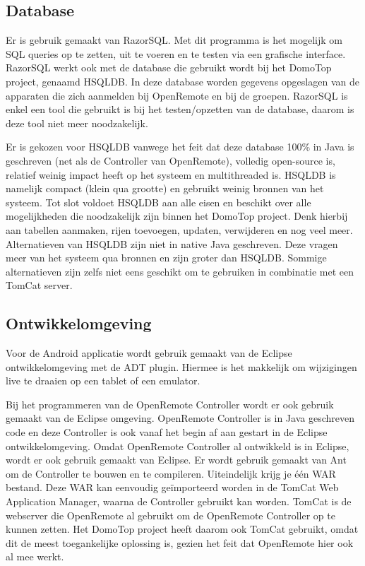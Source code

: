 \documentclass[]{article}
\begin{document}
\subsection{Database}
Er is gebruik gemaakt van RazorSQL. Met dit programma is het mogelijk om
SQL queries op te zetten, uit te voeren en te testen via een grafische
interface. RazorSQL werkt ook met de database die gebruikt wordt bij het DomoTop project,
genaamd HSQLDB. In deze database worden gegevens opgeslagen van de
apparaten die zich aanmelden bij OpenRemote en bij de groepen.
RazorSQL is enkel een tool die gebruikt is bij het
testen/opzetten van de database, daarom is deze tool niet meer
noodzakelijk.

Er is gekozen voor HSQLDB vanwege het feit dat deze database 100\% in Java
is geschreven (net als de Controller van OpenRemote), volledig open-source is,
relatief weinig impact heeft op het systeem en multithreaded is.
HSQLDB is namelijk compact (klein qua grootte) en gebruikt weinig bronnen van het systeem. 
Tot slot voldoet HSQLDB aan alle eisen en beschikt over alle mogelijkheden die noodzakelijk
zijn binnen het DomoTop project. Denk hierbij aan tabellen aanmaken, rijen
toevoegen, updaten, verwijderen en nog veel meer. Alternatieven van HSQLDB zijn
niet in native Java geschreven. Deze vragen meer van het systeem qua
bronnen en zijn groter dan HSQLDB. Sommige alternatieven zijn zelfs niet
eens geschikt om te gebruiken in combinatie met een TomCat server.

\subsection{Ontwikkelomgeving}
Voor de Android applicatie wordt gebruik gemaakt van de Eclipse
ontwikkelomgeving met de ADT plugin. Hiermee is het makkelijk om wijzigingen
live te draaien op een tablet of een emulator.

Bij het programmeren van de OpenRemote Controller wordt er ook gebruik gemaakt
van de Eclipse omgeving. OpenRemote Controller is in Java geschreven code
en deze Controller is ook vanaf het begin af aan gestart in de Eclipse
ontwikkelomgeving. Omdat OpenRemote Controller al ontwikkeld is in
Eclipse, wordt er ook gebruik gemaakt van Eclipse. Er wordt gebruik gemaakt van Ant 
om de Controller te bouwen en te compileren. Uiteindelijk krijg
je \'e\'en WAR bestand. Deze WAR kan eenvoudig ge\"importeerd worden in de TomCat
Web Application Manager, waarna de Controller gebruikt kan worden. TomCat is
de webserver die OpenRemote al gebruikt om de OpenRemote Controller op te
kunnen zetten. Het DomoTop project heeft daarom ook TomCat gebruikt, omdat
dit de meest toegankelijke oplossing is, gezien het feit dat OpenRemote hier
ook al mee werkt.
\end{document}
